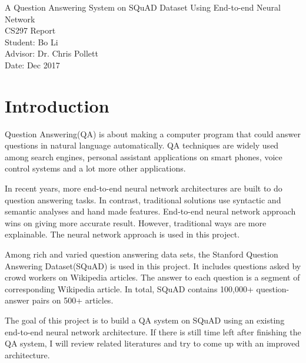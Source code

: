 \documentclass[12pt]{article}
\begin{document}
\begin{titlepage}
\begin{center}
        \vspace*{3cm}
        {\Huge A Question Answering System on SQuAD Dataset Using End-to-end Neural Network}\\

        \vspace*{3cm}
        {\Huge CS297 Report}\\

        \vspace{3 cm}
        Student: Bo Li\\
        Advisor: Dr. Chris Pollett\\
        Date: Dec 2017

 \end{center}
\clearpage
\end{titlepage}

\begin{titlepage}
\tableofcontents
\clearpage
\end{titlepage}



\section{Introduction}

Question Answering(QA) is about making a computer program that could answer questions in natural language automatically. QA techniques are widely used among search engines, personal assistant applications on smart phones, voice control systems and a lot more other applications.

In recent years, more end-to-end neural network architectures are built to do question answering tasks. In contrast, traditional solutions use syntactic and semantic analyses and hand made features. End-to-end neural network approach wins on giving more accurate result. However, traditional ways are more explainable. The neural network approach is used in this project.

Among rich and varied question answering data sets, the Stanford Question Answering Dataset(SQuAD) is used in this project. It includes questions asked by crowd workers on Wikipedia articles. The answer to each question is a segment of corresponding Wikipedia article\cite{rajpurkar2016squad}. In total, SQuAD contains 100,000+ question-answer pairs on 500+ articles\cite{rajpurkar2016squad}.


The goal of this project is to build a QA system on SQuAD using an existing end-to-end neural network architecture. If there is still time left after finishing the QA system, I will review related literatures and try to come up with an improved architecture.
\end{document}
